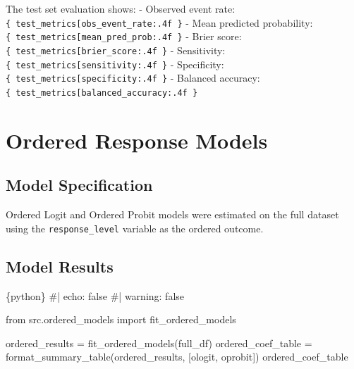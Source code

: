 \documentclass[
  letterpaper,
  DIV=11,
  numbers=noendperiod]{scrartcl}
\newenvironment{Shaded}{\begin{snugshade}}{\end{snugshade}}
\newcommand{\CommentTok}[1]{\textcolor[rgb]{0.37,0.37,0.37}{#1}}
\newcommand{\ImportTok}[1]{\textcolor[rgb]{0.00,0.46,0.62}{#1}}
\newcommand{\InformationTok}[1]{\textcolor[rgb]{0.37,0.37,0.37}{#1}}
\newcommand{\NormalTok}[1]{\textcolor[rgb]{0.00,0.23,0.31}{#1}}
\newcommand{\OperatorTok}[1]{\textcolor[rgb]{0.37,0.37,0.37}{#1}}
\newcommand{\StringTok}[1]{\textcolor[rgb]{0.13,0.47,0.30}{#1}}
\begin{document}
The test set evaluation shows: - Observed event rate:
\texttt{\{\ test\_metrics{[}\textquotesingle{}obs\_event\_rate\textquotesingle{}{]}:.4f\ \}}
- Mean predicted probability:
\texttt{\{\ test\_metrics{[}\textquotesingle{}mean\_pred\_prob\textquotesingle{}{]}:.4f\ \}}
- Brier score:
\texttt{\{\ test\_metrics{[}\textquotesingle{}brier\_score\textquotesingle{}{]}:.4f\ \}}
- Sensitivity:
\texttt{\{\ test\_metrics{[}\textquotesingle{}sensitivity\textquotesingle{}{]}:.4f\ \}}
- Specificity:
\texttt{\{\ test\_metrics{[}\textquotesingle{}specificity\textquotesingle{}{]}:.4f\ \}}
- Balanced accuracy:
\texttt{\{\ test\_metrics{[}\textquotesingle{}balanced\_accuracy\textquotesingle{}{]}:.4f\ \}}

\section{Ordered Response Models}\label{ordered-response-models}

\subsection{Model Specification}\label{model-specification-1}

Ordered Logit and Ordered Probit models were estimated on the full
dataset using the \texttt{response\_level} variable as the ordered
outcome.

\subsection{Model Results}\label{model-results-1}

\begin{Shaded}
\begin{Highlighting}[]
\InformationTok{\textasciigrave{}\textasciigrave{}\textasciigrave{}\{python\}}
\CommentTok{\#| echo: false}
\CommentTok{\#| warning: false}

\ImportTok{from}\NormalTok{ src.ordered\_models }\ImportTok{import}\NormalTok{ fit\_ordered\_models}

\NormalTok{ordered\_results }\OperatorTok{=}\NormalTok{ fit\_ordered\_models(full\_df)}
\NormalTok{ordered\_coef\_table }\OperatorTok{=}\NormalTok{ format\_summary\_table(ordered\_results, [}\StringTok{\textquotesingle{}ologit\textquotesingle{}}\NormalTok{, }\StringTok{\textquotesingle{}oprobit\textquotesingle{}}\NormalTok{])}
\NormalTok{ordered\_coef\_table}
\InformationTok{\textasciigrave{}\textasciigrave{}\textasciigrave{}}
\end{Highlighting}
\end{Shaded}
\end{document}
